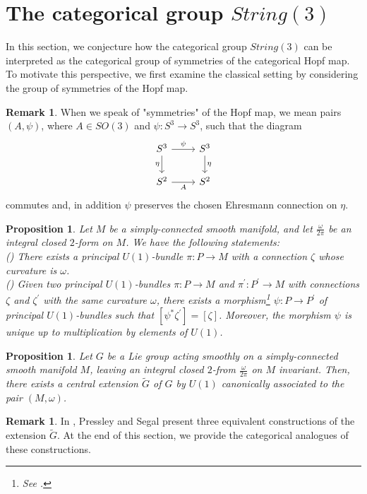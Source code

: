 \documentclass{article}
\theoremstyle{plain}
\newtheorem{prop}[thm]{Proposition}
\theoremstyle{definition}
\newtheorem{rem}[thm]{Remark}
\newcommand{\rNum}[1]{\lowercase\expandafter{\romannumeral #1\relax}}
\begin{document}
%
\section{The categorical group \texorpdfstring{$String(3)$}{String(3)}}
In this section, we conjecture how the categorical group $String(3)$ can be interpreted as the categorical group of symmetries of the categorical Hopf map. To motivate this perspective, we first examine the classical setting by considering the group of symmetries of the Hopf map.
\begin{rem}
When we speak of "symmetries" of the Hopf map, we mean pairs $(A,\psi)$, where $A \in SO(3)$ and $\psi:S^3 \longrightarrow S^3$, such that the diagram
\[
\begin{tikzcd}
S^3 \arrow[r,"\psi"] \arrow[d,"\eta"'] & S^3 \arrow[d,"\eta"] \\
S^2 \arrow[r,"A"'] & S^2
\end{tikzcd}
\]
commutes and, in addition $\psi$ preserves the chosen Ehresmann connection on $\eta$.
\end{rem}
\begin{prop}\cite[Proposition 4.5.3 on page 52]{MR900587}\label{secondprop}
Let $M$ be a simply-connected smooth manifold, and let $\frac{\omega}{2\pi}$ be an integral closed $2$-form on $M$. We have the following statements: \\
(\rNum{1}) There exists a principal $U(1)$-bundle $\pi:P \longrightarrow M$ with a connection $\zeta$ whose curvature is $\omega$. \\
(\rNum{2}) Given two principal $U(1)$-bundles $\pi:P \longrightarrow M$ and $\pi^\prime:P^\prime \longrightarrow M$ with connections $\zeta$ and $\zeta^\prime$ with the same
curvature $\omega$, there exists a morphism\footnote{See \cite[on page 571]{MR2805195}.} $\psi:P \longrightarrow P^\prime$ of principal $U(1)$-bundles such that $[\psi^*\zeta^\prime] = [\zeta]$. Moreover, the morphism $\psi$ is unique up to multiplication by elements of $U(1)$.
\end{prop}
\begin{prop}\cite[Proposition 4.4.2 on page 47]{MR900587}\label{firstprop} Let $G$ be a Lie group acting smoothly on a simply-connected smooth manifold $M$, leaving an integral closed $2$-from $\frac{\omega}{2\pi}$ on $M$ invariant. Then, there exists a central extension $\widetilde{G}$ of $G$ by $U(1)$ canonically associated to the pair $(M,\omega)$.
\end{prop}
\begin{rem}
In \cite[following Propositions \ref{secondprop} and \ref{firstprop}]{MR900587}, Pressley and Segal present three equivalent constructions of the extension $\widetilde{G}$. At the end of this section, we provide the categorical analogues of these constructions.
\end{rem}
\end{document}

